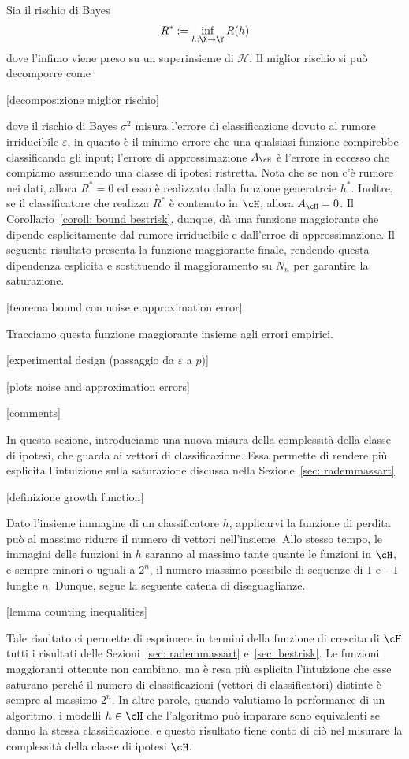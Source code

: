 Sia il rischio di Bayes
\[
R^* := \inf_{h:\X\to\Y} R(h)
\] 
dove l'infimo viene preso su un superinsieme di $\mathcal H$. Il miglior rischio si può decomporre come

[decomposizione miglior rischio]

dove il rischio di Bayes $\sigma^2$ misura l'errore di classificazione dovuto al rumore irriducibile $\varepsilon$, in quanto è il minimo errore che una qualsiasi funzione compirebbe classificando gli input; l'errore di approssimazione $A_\cH$ è l'errore in eccesso che compiamo assumendo una classe di ipotesi ristretta. Nota che se non c'è rumore nei dati, allora $R^* = 0$ ed esso è realizzato dalla funzione generatrcie $h^*$. Inoltre, se il classificatore che realizza $R^*$ è contenuto in $\cH$, allora $A_\cH = 0$. Il Corollario~\ref{coroll: bound bestrisk}, dunque, dà una funzione maggiorante che dipende esplicitamente dal rumore irriducibile e dall'erroe di approssimazione. Il seguente risultato presenta la funzione maggiorante finale, rendendo questa dipendenza esplicita e sostituendo il maggioramento su $N_n$ per garantire la saturazione.

[teorema bound con noise e approximation error]

Tracciamo questa funzione maggiorante insieme agli errori empirici.

[experimental design (passaggio da $\varepsilon$ a $p$)]

[plots noise and approximation errors]

[comments]

In questa sezione, introduciamo una nuova misura della complessità della classe di ipotesi, che guarda ai vettori di classificazione. Essa permette di rendere più esplicita l'intuizione sulla saturazione discussa nella Sezione~\ref{sec: rademmassart}. 

[definizione growth function]

Dato l'insieme immagine di un classificatore $h$, applicarvi la funzione di perdita può al massimo ridurre il numero di vettori nell'insieme. Allo stesso tempo, le immagini delle funzioni in $h$ saranno al massimo tante quante le funzioni in $\cH$, e sempre minori o uguali a $2^n$, il numero massimo possibile di sequenze di $1$ e $-1$ lunghe $n$. Dunque, segue la seguente catena di diseguaglianze. 

[lemma counting inequalities]

Tale risultato ci permette di esprimere in termini della funzione di crescita di $\cH$ tutti i risultati delle Sezioni~\ref{sec: rademmassart} e~\ref{sec: bestrisk}. Le funzioni maggioranti ottenute non cambiano, ma è resa più esplicita l'intuizione che esse saturano perché il numero di classificazioni (vettori di classificatori) distinte è sempre al massimo $2^n$. In altre parole, quando valutiamo la performance di un algoritmo, i modelli $h\in\cH$ che l'algoritmo può imparare sono equivalenti se danno la stessa classificazione, e questo risultato tiene conto di ciò nel misurare la complessità della classe di ipotesi $\cH$. 
